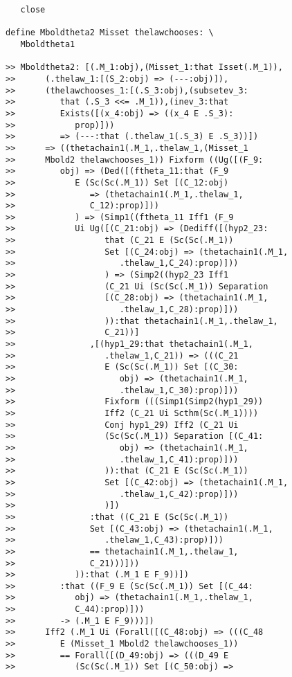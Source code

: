 \documentclass[12pt]{article}
\begin{document}
\begin{verbatim}
   close

define Mboldtheta2 Misset thelawchooses: \
   Mboldtheta1

>> Mboldtheta2: [(.M_1:obj),(Misset_1:that Isset(.M_1)),
>>      (.thelaw_1:[(S_2:obj) => (---:obj)]),
>>      (thelawchooses_1:[(.S_3:obj),(subsetev_3:
>>         that (.S_3 <<= .M_1)),(inev_3:that
>>         Exists([(x_4:obj) => ((x_4 E .S_3):
>>            prop)]))
>>         => (---:that (.thelaw_1(.S_3) E .S_3))])
>>      => ((thetachain1(.M_1,.thelaw_1,(Misset_1
>>      Mbold2 thelawchooses_1)) Fixform ((Ug([(F_9:
>>         obj) => (Ded([(ftheta_11:that (F_9
>>            E (Sc(Sc(.M_1)) Set [(C_12:obj)
>>               => (thetachain1(.M_1,.thelaw_1,
>>               C_12):prop)]))
>>            ) => (Simp1((ftheta_11 Iff1 (F_9
>>            Ui Ug([(C_21:obj) => (Dediff([(hyp2_23:
>>                  that (C_21 E (Sc(Sc(.M_1))
>>                  Set [(C_24:obj) => (thetachain1(.M_1,
>>                     .thelaw_1,C_24):prop)]))
>>                  ) => (Simp2((hyp2_23 Iff1
>>                  (C_21 Ui (Sc(Sc(.M_1)) Separation
>>                  [(C_28:obj) => (thetachain1(.M_1,
>>                     .thelaw_1,C_28):prop)]))
>>                  )):that thetachain1(.M_1,.thelaw_1,
>>                  C_21))]
>>               ,[(hyp1_29:that thetachain1(.M_1,
>>                  .thelaw_1,C_21)) => (((C_21
>>                  E (Sc(Sc(.M_1)) Set [(C_30:
>>                     obj) => (thetachain1(.M_1,
>>                     .thelaw_1,C_30):prop)]))
>>                  Fixform (((Simp1(Simp2(hyp1_29))
>>                  Iff2 (C_21 Ui Scthm(Sc(.M_1))))
>>                  Conj hyp1_29) Iff2 (C_21 Ui
>>                  (Sc(Sc(.M_1)) Separation [(C_41:
>>                     obj) => (thetachain1(.M_1,
>>                     .thelaw_1,C_41):prop)]))
>>                  )):that (C_21 E (Sc(Sc(.M_1))
>>                  Set [(C_42:obj) => (thetachain1(.M_1,
>>                     .thelaw_1,C_42):prop)]))
>>                  )])
>>               :that ((C_21 E (Sc(Sc(.M_1))
>>               Set [(C_43:obj) => (thetachain1(.M_1,
>>                  .thelaw_1,C_43):prop)]))
>>               == thetachain1(.M_1,.thelaw_1,
>>               C_21)))]))
>>            )):that (.M_1 E F_9))])
>>         :that ((F_9 E (Sc(Sc(.M_1)) Set [(C_44:
>>            obj) => (thetachain1(.M_1,.thelaw_1,
>>            C_44):prop)]))
>>         -> (.M_1 E F_9)))])
>>      Iff2 (.M_1 Ui (Forall([(C_48:obj) => (((C_48
>>         E (Misset_1 Mbold2 thelawchooses_1))
>>         == Forall([(D_49:obj) => (((D_49 E
>>            (Sc(Sc(.M_1)) Set [(C_50:obj) =>

\end{verbatim}
\end{document}
